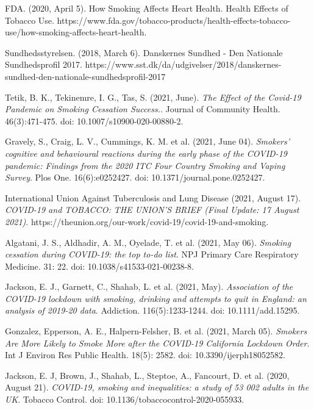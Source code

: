 \documentclass[
  11pt,
]{article}
\begin{document}
\newpage 
\begin{thebibliography}{1}

 FDA. (2020, April 5). How Smoking Affects Heart Health. Health Effects of Tobacco Use. https://www.fda.gov/tobacco-products/health-effects-tobacco-use/how-smoking-affects-heart-health.

 Sundhedsstyrelsen. (2018, March 6). Danskernes Sundhed - Den Nationale Sundhedsprofil 2017. https://www.sst.dk/da/udgivelser/2018/danskernes-sundhed-den-nationale-sundhedsprofil-2017

 Tetik, B. K., Tekinemre, I. G., Tas, S. (2021, June). \textit{The Effect of the Covid-19 Pandemic on Smoking Cessation Success.}. Journal of Community Health. 46(3):471-475. doi: 10.1007/s10900-020-00880-2.

 Gravely, S., Craig, L. V., Cummings, K. M. et al. (2021, June 04). \textit{Smokers' cognitive and behavioural reactions during the early phase of the COVID-19 pandemic: Findings from the 2020 ITC Four Country Smoking and Vaping Survey}. Plos One. 16(6):e0252427. doi: 10.1371/journal.pone.0252427.

 International Union Against Tuberculosis and Lung Disease (2021, August 17). \textit{COVID-19 and TOBACCO: THE UNION’S BRIEF (Final Update: 17 August 2021)}. https://theunion.org/our-work/covid-19/covid-19-and-smoking.

 Algatani, J. S., Aldhadir, A. M., Oyelade, T. et al. (2021, May 06). \textit{Smoking cessation during COVID-19: the top to-do list}. NPJ Primary Care Respiratory Medicine. 31: 22. doi: 10.1038/s41533-021-00238-8.

 Jackson, E. J., Garnett, C., Shahab, L. et al. (2021, May). \textit{Association of the COVID-19 lockdown with smoking, drinking and attempts to quit in England: an analysis of 2019-20 data}. Addiction. 116(5):1233-1244. doi: 10.1111/add.15295.

 Gonzalez, Epperson, A. E., Halpern-Felsher, B. et al. (2021, March 05). \textit{Smokers Are More Likely to Smoke More after the COVID-19 California Lockdown Order}. Int J Environ Res Public Health. 18(5): 2582. doi: 10.3390/ijerph18052582.

 Jackson, E. J, Brown, J., Shahab, L., Steptoe, A., Fancourt, D. et al. (2020, August 21). \textit{COVID-19, smoking and inequalities: a study of 53 002 adults in the UK}. Tobacco Control. doi: 10.1136/tobaccocontrol-2020-055933.


\end{thebibliography}
\end{document}
